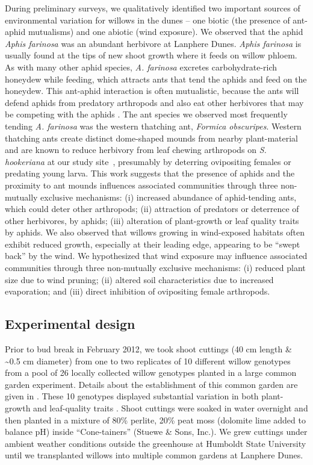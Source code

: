 \documentclass[11pt]{article}
\begin{document}
During preliminary surveys, we qualitatively identified two important
sources of environmental variation for willows in the dunes -- one
biotic (the presence of ant-aphid mutualisms) and one abiotic (wind
exposure). We observed that the aphid \emph{Aphis farinosa} was an
abundant herbivore at Lanphere Dunes. \emph{Aphis farinosa} is usually
found at the tips of new shoot growth where it feeds on willow phloem.
As with many other aphid species, \emph{A. farinosa} excretes
carbohydrate-rich honeydew while feeding, which attracts ants that tend
the aphids and feed on the honeydew. This ant-aphid interaction is often
mutualistic, because the ants will defend aphids from predatory
arthropods and also eat other herbivores that may be competing with the
aphids \cite{Floate_1994}\cite{Mooney_2008}. The ant species we observed
most frequently tending \emph{A. farinosa} was the western thatching
ant, \emph{Formica obscuripes}. Western thatching ants create distinct
dome-shaped mounds from nearby plant-material and are known to reduce
herbivory from leaf chewing arthropods on \emph{S. hookeriana} at our
study site~\cite{CRUTSINGER_2005}, presumably by deterring ovipositing
females or predating young larva. This work suggests that the presence
of aphids and the proximity to ant mounds influences associated
communities through three non-mutually exclusive mechanisms: (i)
increased abundance of aphid-tending ants, which could deter other
arthropods; (ii) attraction of predators or deterrence of other
herbivores, by aphids; (iii) alteration of plant-growth or leaf quality
traits by aphids. We also observed that willows growing in wind-exposed
habitats often exhibit reduced growth, especially at their leading edge,
appearing to be ``swept back'' by the wind. We hypothesized that wind
exposure may influence associated communities through three non-mutually
exclusive mechanisms: (i) reduced plant size due to wind pruning; (ii)
altered soil characteristics due to increased evaporation; and (iii)
direct inhibition of ovipositing female arthropods.

\subsection*{Experimental design}

Prior to bud break in February 2012, we took shoot cuttings (40 cm
length \& \textasciitilde{}0.5 cm diameter) from one to two replicates
of 10 different willow genotypes from a pool of 26 locally collected
willow genotypes planted in a large common garden experiment. Details
about the establishment of this common garden are given in
\cite{Barbour_2015}. These 10 genotypes displayed substantial variation in
both plant-growth and leaf-quality traits \cite{Barbour_2015}. Shoot
cuttings were soaked in water overnight and then planted in a mixture of
80\% perlite, 20\% peat moss (dolomite lime added to balance pH) inside
``Cone-tainers'' (Stuewe \& Sons, Inc.). We grew cuttings under ambient
weather conditions outside the greenhouse at Humboldt State University
until we transplanted willows into multiple common gardens at Lanphere
Dunes.
\end{document}
